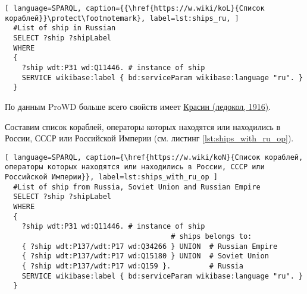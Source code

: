 \begin{lstlisting}[ language=SPARQL, caption={{\href{https://w.wiki/koL}{Список кораблей}}\protect\footnotemark}, label=lst:ships_ru, ]
  #List of ship in Russian
  SELECT ?ship ?shipLabel
  WHERE
  {
    ?ship wdt:P31 wd:Q11446. # instance of ship
    SERVICE wikibase:label { bd:serviceParam wikibase:language "ru". }
  }
\end{lstlisting}

По данным ProWD больше всего свойств имеет \href{https://www.wikidata.org/wiki/Q281147}{Красин (ледокол, 1916)}\cite{ProWD_ru_ships}.

Составим список кораблей, операторы которых находятся или находились в России, СССР или Российской Империи (см. листинг \ref{lst:ships_with_ru_op}).

\begin{lstlisting}[ language=SPARQL, caption={\href{https://w.wiki/koN}{Cписок кораблей, операторы которых находятся или находились в России, СССР или Российской Империи}}, label=lst:ships_with_ru_op ]
  #List of ship from Russia, Soviet Union and Russian Empire
  SELECT ?ship ?shipLabel
  WHERE
  {
    ?ship wdt:P31 wd:Q11446. # instance of ship
                                       # ships belongs to:
    { ?ship wdt:P137/wdt:P17 wd:Q34266 } UNION  # Russian Empire
    { ?ship wdt:P137/wdt:P17 wd:Q15180 } UNION  # Soviet Union
    { ?ship wdt:P137/wdt:P17 wd:Q159 }.         # Russia
    SERVICE wikibase:label { bd:serviceParam wikibase:language "ru". }
  }
\end{lstlisting}




